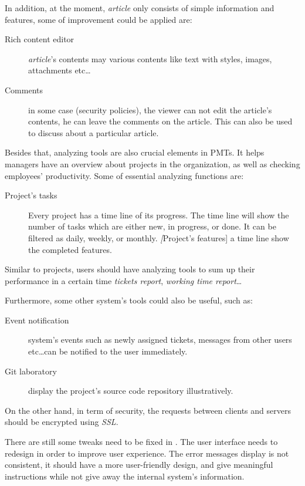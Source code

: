 In addition, at the moment, \emph{article} only consists of simple information and features, some of improvement could be applied are:
\begin{description}
\item[Rich content editor] \emph{article}'s contents may various contents like text with styles, images, attachments etc\dots
\item[Comments] in some case (\eg security policies), the viewer can not edit the article's contents, he can leave the comments on the article.
This can also be used to discuss about a particular article.
\end{description}

Besides that, analyzing tools are also crucial elements in PMTs.
It helps managers have an overview about projects in the organization, as well as checking employees' productivity.
Some of essential analyzing functions are:
\begin{description}
\item[Project's tasks] Every project has a time line of its progress.
The time line will show the number of tasks which are either new, in progress, or done.
It can be filtered as daily, weekly, or monthly.
\emph[Project's features] a time line show the completed features.
\end{description}
Similar to projects, users should have analyzing tools to sum up their performance in a certain time \eg \emph{tickets report}, \emph{working time report}\dots

Furthermore, some other system's tools could also be useful, such as:
\begin{description}
\item[Event notification] system's events such as newly assigned tickets, messages from other users etc\dots can be notified to the user immediately.
\item[Git laboratory] display the project's source code repository illustratively.
\end{description}

On the other hand, in term of security, the requests between clients and servers should be encrypted using \emph{SSL}.

There are still some tweaks need to be fixed in \myProject.
The user interface needs to redesign in order to improve user experience.
The error messages display is not consistent, it should have a more user-friendly design, and give meaningful instructions while not give away the internal system's information.

